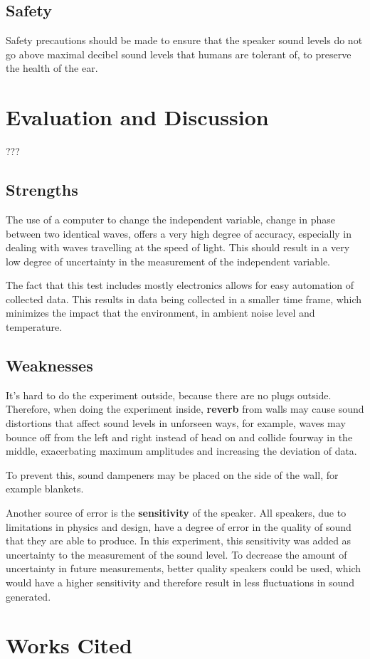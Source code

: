 \documentclass[index]{subfiles}
\begin{document}
\subsection{Safety}

Safety precautions should be made to ensure that the speaker sound levels do not go above maximal decibel sound levels that humans are tolerant of, to preserve the health of the ear.

\section{Evaluation and Discussion}???

\subsection{Strengths}

The use of a computer to change the independent variable, change in phase between two identical waves, offers a very high degree of accuracy, especially in dealing with waves travelling at the speed of light. This should result in a very low degree of uncertainty in the measurement of the independent variable.

The fact that this test includes mostly electronics allows for easy automation of collected data. This results in data being collected in a smaller time frame, which minimizes the impact that the environment, in ambient noise level and temperature.

\subsection{Weaknesses}

It's hard to do the experiment outside, because there are no plugs outside. Therefore, when doing the experiment inside, \textbf{reverb} from walls may cause sound distortions that affect sound levels in unforseen ways, for example, waves may bounce off from the left and right instead of head on and collide fourway in the middle, exacerbating maximum amplitudes and increasing the deviation of data.

To prevent this, sound dampeners may be placed on the side of the wall, for example blankets.

Another source of error is the \textbf{sensitivity} of the speaker. All speakers, due to limitations in physics and design, have a degree of error in the quality of sound that they are able to produce. In this experiment, this sensitivity was added as uncertainty to the measurement of the sound level. To decrease the amount of uncertainty in future measurements, better quality speakers could be used, which would have a higher sensitivity and therefore result in less fluctuations in sound generated.

\section{Works Cited}


\end{document}
